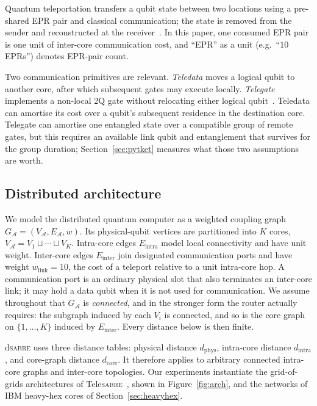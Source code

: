 \documentclass[journal]{IEEEtran}
\newcommand{\dSABRE}{d\textsc{sabre}}
\newcommand{\TeleSABRE}{Tele\textsc{sabre}}
\newcommand{\arch}{\mathcal{A}}
\newcommand{\dphys}{d_{\mathrm{phys}}}
\newcommand{\dintra}{d_{\mathrm{intra}}}
\newcommand{\dcore}{d_{\mathrm{core}}}
\begin{document}
Quantum teleportation transfers a qubit state between two locations using a
pre-shared EPR pair and classical communication;
the state is removed from the sender and reconstructed at the
receiver~\cite{bennett1993teleporting}. In this paper, one consumed EPR pair is one
unit of inter-core communication cost, and ``EPR'' as a unit (e.g.\ ``$10$
EPRs'') denotes EPR-pair count.

Two communication primitives are relevant. \emph{Teledata} moves a logical
qubit to another core, after which subsequent gates may execute locally.
\emph{Telegate} implements a non-local 2Q gate without relocating either
logical qubit~\cite{eisert2000optimal}. Teledata can amortise its cost over a
qubit's subsequent residence in the destination core. Telegate can amortise
one entangled state over a compatible group of remote gates, but this requires
an available link qubit and entanglement that survives for the group duration;
Section~\ref{sec:pytket} measures what those two assumptions are worth.

\subsection{Distributed architecture}
\label{sec:arch}

We model the distributed quantum computer as a weighted coupling graph
$G_\arch=(V_\arch,E_\arch,w)$. Its physical-qubit vertices are partitioned into $K$ cores,
$V_\arch=V_1\sqcup\cdots\sqcup V_K$. Intra-core edges $E_{\mathrm{intra}}$ model
local connectivity and have unit weight. Inter-core edges
$E_{\mathrm{inter}}$ join designated communication ports and have weight
$w_{\mathrm{link}}=10$, the cost of a teleport relative to a unit intra-core
hop. A communication port is an ordinary physical slot that also
terminates an inter-core link; it may hold a data qubit when it is not used
for communication. We assume throughout that $G_\arch$ is \emph{connected},
and in the stronger form the router actually requires: the subgraph induced
by each $V_i$ is connected, and so is the core graph on $\{1,\dots,K\}$
induced by $E_{\mathrm{inter}}$. Every distance below is then finite.

\dSABRE{} uses three distance tables: physical distance $\dphys$,
intra-core distance $\dintra$, and core-graph distance $\dcore$. It therefore
applies to arbitrary connected intra-core graphs and inter-core topologies. Our
experiments instantiate the grid-of-grids architectures of
\TeleSABRE{}~\cite{russo2025telesabre}, shown in Figure~\ref{fig:arch}, and the
networks of IBM heavy-hex cores of Section~\ref{sec:heavyhex}.
\end{document}
